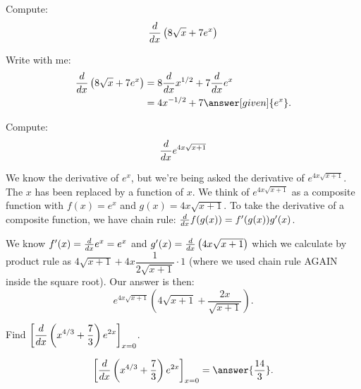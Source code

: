 \documentclass{ximera}
\begin{document}
\begin{example}
Compute:
\[
\frac{d}{\mathop{}\!d x}\left(8\sqrt{x} + 7e^x \right)
\]
	\begin{explanation}
		Write with me:
		\begin{align*}
			\ddx\left(8\sqrt{x} + 7e^x \right) &= 8\ddx x^{1/2} + 7\ddx e^x\\
				&= 4x^{-1/2} + 7 \answer[given]{e^x}.
		\end{align*}
	\end{explanation}
\end{example}




\begin{example}
	Compute: \[ \frac{d}{\mathop{}\!d x} e^{4x\sqrt{x+1}} \]
	\begin{explanation}
		We know the derivative of $e^x$, but we're being asked the derivative of $e^{4x \sqrt{x+1}}$.  The $x$ has been replaced by a function of $x$.
		We think of $e^{4x \sqrt{x+1}}$ as a composite function with $f(x) = e^x$ and $g(x) = 4x \sqrt{x+1}$.
		To take the derivative of a composite function, we have chain rule: $\frac{d}{\mathop{}\!d x} f(g(x)) = f'( g(x) ) g'(x)$.  
		
		We know $f'(x) = \frac{d}{\mathop{}\!d x} e^x = e^x$ and $g'(x) = \frac{d}{\mathop{}\!d x} \left( 4x \sqrt{x+1} \right)$ which we calculate by product rule as
		$4 \sqrt{x+1} + 4x \dfrac{1}{2 \sqrt{x+1}} \cdot 1$ (where we used chain rule AGAIN inside the square root).
		Our answer is then:
		\[ e^{4x \sqrt{x+1}}\left( 4\sqrt{x+1} + \dfrac{2x}{\sqrt{x+1}}\right).\]
	\end{explanation}	
\end{example}

\begin{question}
	  Find $\displaystyle \bigg[ \frac{d}{\mathop{}\!d x} \left(x^{4/3}+\frac{7}{3}\right) e^{2x} \bigg]_{x=0}$.
	  
  \begin{prompt}
    \[\displaystyle \eval{\ddx \left(x^{4/3}+\frac{7}{3}\right) e^{2x}}_{x=0} = \answer{\frac{14}{3}}.\]
  \end{prompt}
\end{question}
\end{document}
